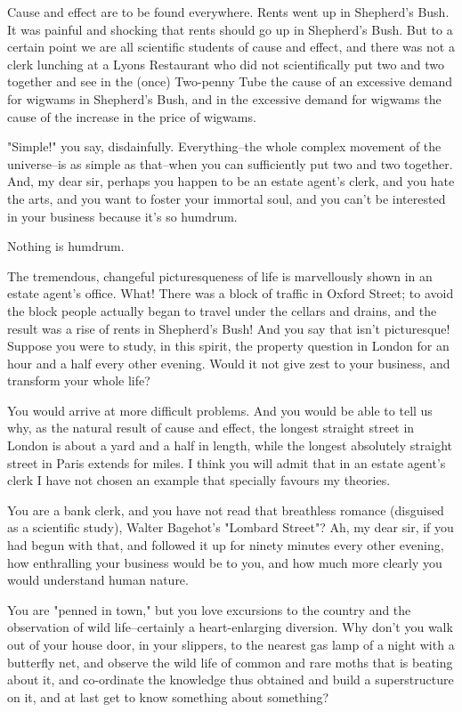 Cause and effect are to be found everywhere.  Rents went up in
Shepherd's Bush.  It was painful and shocking that rents should go up
in Shepherd's Bush.  But to a certain point we are all scientific
students of cause and effect, and there was not a clerk lunching at a
Lyons Restaurant who did not scientifically put two and two together
and see in the (once) Two-penny Tube the cause of an excessive demand
for wigwams in Shepherd's Bush, and in the excessive demand for wigwams
the cause of the increase in the price of wigwams.

"Simple!" you say, disdainfully.  Everything--the whole complex
movement of the universe--is as simple as that--when you can
sufficiently put two and two together.  And, my dear sir, perhaps you
happen to be an estate agent's clerk, and you hate the arts, and you
want to foster your immortal soul, and you can't be interested in your
business because it's so humdrum.

Nothing is humdrum.

The tremendous, changeful picturesqueness of life is marvellously shown
in an estate agent's office.  What!  There was a block of traffic in
Oxford Street; to avoid the block people actually began to travel under
the cellars and drains, and the result was a rise of rents in
Shepherd's Bush!  And you say that isn't picturesque! Suppose you were
to study, in this spirit, the property question in London for an hour
and a half every other evening. Would it not give zest to your
business, and transform your whole life?

You would arrive at more difficult problems.  And you would be able to
tell us why, as the natural result of cause and effect, the longest
straight street in London is about a yard and a half in length, while
the longest absolutely straight street in Paris extends for miles.  I
think you will admit that in an estate agent's clerk I have not chosen
an example that specially favours my theories.

You are a bank clerk, and you have not read that breathless romance
(disguised as a scientific study), Walter Bagehot's "Lombard Street"?
Ah, my dear sir, if you had begun with that, and followed it up for
ninety minutes every other evening, how enthralling your business would
be to you, and how much more clearly you would understand human nature.

You are "penned in town," but you love excursions to the country and
the observation of wild life--certainly a heart-enlarging diversion.
Why don't you walk out of your house door, in your slippers, to the
nearest gas lamp of a night with a butterfly net, and observe the wild
life of common and rare moths that is beating about it, and co-ordinate
the knowledge thus obtained and build a superstructure on it, and at
last get to know something about something?

